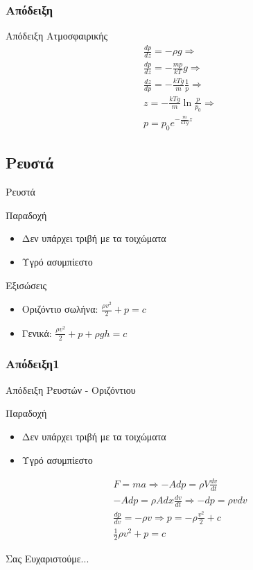 \documentclass[greek]{beamer}
\begin{document}
\subsubsection{Απόδειξη}
\begin{frame}{Απόδειξη Ατμοσφαιρικής}
  \begin{gather*}
   \frac{dp}{dz}=-ρg \Rightarrow \\ \frac{dp}{dz}=-\frac{mp}{kT}g \Rightarrow \\ \frac{dz}{dp}=-\frac{kTg}{m}\frac{1}{p} \Rightarrow \\ z=-\frac{kTg}{m}\ln \frac{p}{p_0} \Rightarrow \\ p=p_0e^{-\frac{m}{kTg}z}
  \end{gather*}
\end{frame}

\subsection{Ρευστά}
\begin{frame}{Ρευστά}
  \begin{block}{Παραδοχή}
    \begin{itemize}
      \item Δεν υπάρχει τριβή με τα τοιχώματα
      \item Υγρό ασυμπίεστο
    \end{itemize}
  \end{block}
  Εξισώσεις
  \begin{itemize}
    \item<1-> Οριζόντιο σωλήνα: $\displaystyle \frac{ρv^2}{2}+p=c$
    \item<2-> Γενικά: $\displaystyle \frac{ρv^2}{2}+p+ρgh=c$
  \end{itemize}
\end{frame}

\subsubsection{Απόδειξη1}
\begin{frame}{Απόδειξη Ρευστών - Οριζόντιου}
  \begin{block}{Παραδοχή}
    \begin{itemize}
      \item Δεν υπάρχει τριβή με τα τοιχώματα
      \item Υγρό ασυμπίεστο
    \end{itemize}
  \end{block}
  \begin{gather*}
   F=ma \Rightarrow -Adp=ρV\frac{dv}{dt} \\
   -Adp=ρAdx\frac{dv}{dt} \Rightarrow -dp=ρv dv \\
   \frac{dp}{dv}=-ρv \Rightarrow p=-ρ\frac{v^2}{2}+c \\
   \frac{1}{2}ρv^2+p=c
  \end{gather*}
\end{frame}

\begin{frame}[plain,c]
  \begin{center}
    \Huge Σας Ευχαριστούμε...
  \end{center}
\end{frame}
\end{document}

